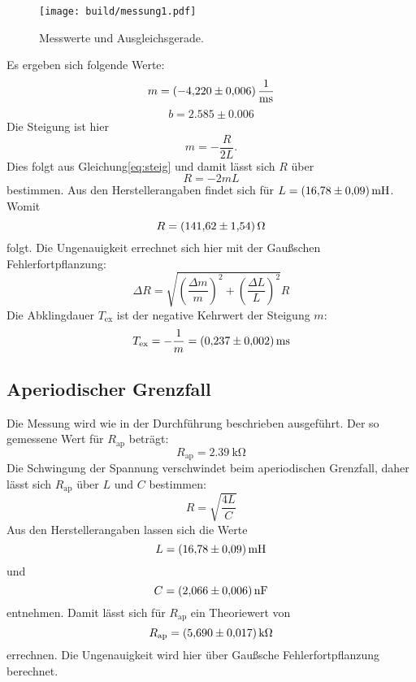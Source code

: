 \begin{figure}
    \centering
    \texttt{[image: build/messung1.pdf]}
    \caption{Messwerte und Ausgleichsgerade.}
    \label{fig:plot1}
\end{figure}
\noindent Es ergeben sich folgende Werte:
\begin{equation*}
  m=\SI{-4.22\pm0.006}{\per\milli\second}
\end{equation*}
\begin{equation*}
  b=2.585\pm0.006
\end{equation*}
Die Steigung ist hier
\begin{equation*}
  m=-\frac{R}{2L}.
\end{equation*}
Dies folgt aus Gleichung\eqref{eq:steig} und damit lässt sich $R$ über
\begin{equation*}
  R=-2mL
\end{equation*}
bestimmen.
Aus den Herstellerangaben findet sich für $L=\SI{16.78\pm0.09}{\milli\henry}$.
Womit
\begin{equation*}
  R=\SI{141.62\pm1.54}{\ohm}
\end{equation*}
folgt.
Die Ungenauigkeit errechnet sich hier mit der Gaußschen Fehlerfortpflanzung:
\begin{equation*}
  \Delta R= \sqrt{(\frac{\Delta m}{m})^2 + (\frac{\Delta L}{L})^2} R
\end{equation*}
Die Abklingdauer $T_\text{ex}$ ist der negative Kehrwert der Steigung $m$:
\begin{equation*}
  T_\text{ex}= -\frac{1}{m} = \SI{0.237\pm0.002}{\milli\second}
\end{equation*}


\subsection{Aperiodischer Grenzfall}
Die Messung wird wie in der Durchführung beschrieben ausgeführt.
Der so gemessene Wert für $R_\text{ap}$ beträgt:
\begin{equation*}
  R_\text{ap}=\SI{2.39}{\kilo\ohm}
\end{equation*}
Die Schwingung der Spannung verschwindet beim aperiodischen Grenzfall, daher lässt sich $R_\text{ap}$ über $L$ und $C$ bestimmen:
\begin{equation*}
  R=\sqrt{\frac{4L}{C}}
\end{equation*}
Aus den Herstellerangaben lassen sich die Werte
\begin{equation*}
  L=\SI{16.78\pm0.09}{\milli\henry}
\end{equation*}
und
\begin{equation*}
  C=\SI{2.066\pm0.006}{\nano\farad}
\end{equation*}
entnehmen.
Damit lässt sich für $R_\text{ap}$ ein Theoriewert von
\begin{equation*}
  R_\text{ap}=\SI{5.69\pm0.017}{\kilo\ohm}
\end{equation*}
errechnen.
Die Ungenauigkeit wird hier über Gaußsche Fehlerfortpflanzung berechnet.

